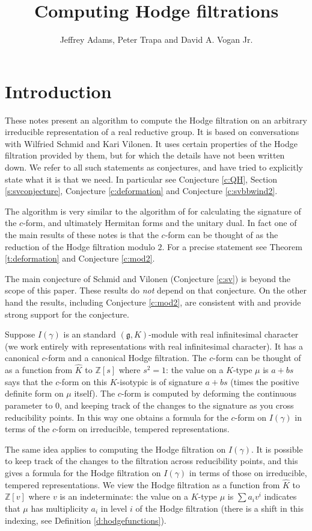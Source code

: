 \documentclass[12pt,leqno]{article}
\newcommand{\Z}{\mathbb Z}
\renewcommand{\sec}[1]{\section{#1}
\renewcommand{\theequation}{\thesection.\arabic{equation}}
  \setcounter{equation}{0}}
\newcommand{\g}{\mathfrak g}
\newcommand\wh{\widehat}
\renewcommand{\sec}[1]{\section{#1}
\renewcommand{\theequation}{\thesection.\arabic{equation}}
  \setcounter{equation}{0}}
\begin{document}
\title{Computing Hodge filtrations}
\author{Jeffrey Adams, Peter Trapa and David A. Vogan Jr.}
\maketitle

\sec{Introduction}
\label{s:introduction}

These notes present an algorithm to compute the Hodge
filtration on an arbitrary irreducible representation of a real
reductive group. It is based on conversations with Wilfried Schmid and
Kari Vilonen. It uses certain properties of the Hodge filtration
provided by them, but for which the details have not been written
down. We refer to all such statements as conjectures, and have tried to
explicitly state what it is that we need.
In particular see Conjecture \ref{c:QH}, Section
\ref{s:svconjecture}, Conjecture \ref{c:deformation} and
Conjecture   \ref{c:svbbwind2}.

The algorithm is very similar to the algorithm of \cite{unitaryDual}
for calculating the signature of the $c$-form, and ultimately Hermitan
forms and the unitary dual. In fact one of the main results of these
notes is that the $c$-form can be thought of as the reduction of the
Hodge filtration modulo $2$. For a precise statement see Theorem
\ref{t:deformation} and Conjecture \ref{c:mod2}.

The main conjecture of Schmid and Vilonen (Conjecture \ref{c:sv})
is beyond the scope of this
paper. These results do {\it not} depend on
that conjecture. On the other hand the results, including Conjecture \ref{c:mod2}, are
consistent with  and provide strong support for the conjecture.

Suppose $I(\gamma)$ is an standard $(\g,K)$-module with real infinitesimal
character (we work entirely with representations with real
infinitesimal character).  It has a canonical $c$-form and a canonical Hodge
filtration. The $c$-form can be thought of as a function from $\wh K$
to $\Z[s]$ where $s^2=1$:  the value on a $K$-type $\mu$ is $a+bs$
says  that the $c$-form on this $K$-isotypic is of signature $a+bs$
(times the positive definite form on $\mu$ itself).
The $c$-form is computed by deforming the continuous
parameter to $0$, and keeping track of the changes to the signature as you cross
reducibility points. In this way one obtains a formula for the
$c$-form on $I(\gamma)$ in terms of the $c$-form on irreducible,
tempered representations.

The same idea applies to computing the Hodge filtration on
$I(\gamma)$. It is possible to keep track of the changes to the
filtration across reducibility points, and this gives a formula for
the Hodge filtration on $I(\gamma)$ in terms of those on irreducible,
tempered representations. We view the Hodge filtration as a function
from $\wh K$ to $\Z[v]$ where $v$ is an indeterminate: the value on a
$K$-type $\mu$ is $\sum a_i v^i$ indicates that $\mu$ has multiplicity
$a_i$ in level $i$ of the Hodge filtration (there is a shift in this
indexing, see Definition \ref{d:hodgefunctions}).
\end{document}
